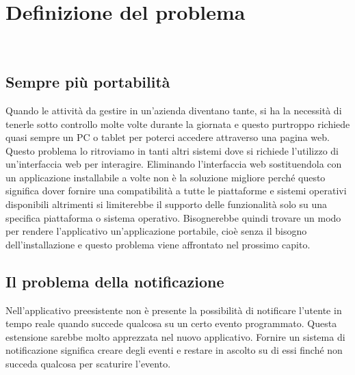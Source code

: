 
\chapter{Definizione del problema}
\label{cap:definizione-problema}

\\



\section{Sempre più portabilità}


Quando le attività da gestire in un'azienda diventano tante, si ha la necessità di tenerle sotto controllo molte volte durante la giornata e questo purtroppo richiede quasi sempre un PC o tablet per poterci accedere attraverso una pagina web. Questo problema lo ritroviamo in tanti altri sistemi dove si richiede l'utilizzo di un'interfaccia web per interagire. Eliminando l'interfaccia web sostituendola con un applicazione installabile a volte non è la soluzione migliore perché questo significa dover fornire una compatibilità a tutte le piattaforme e sistemi operativi disponibili altrimenti si  limiterebbe il supporto delle funzionalità solo su una specifica piattaforma o sistema operativo. Bisognerebbe quindi trovare un modo per rendere l'applicativo un'applicazione portabile, cioè senza il bisogno dell'installazione e questo problema viene affrontato nel prossimo capito.

\section{Il problema della notificazione}

Nell'applicativo preesistente non è presente  la possibilità di notificare l'utente in tempo reale quando succede qualcosa su un certo evento programmato.  Questa estensione sarebbe molto apprezzata nel nuovo applicativo. Fornire un sistema di notificazione significa creare degli eventi e restare in ascolto su di essi finché non succeda qualcosa per scaturire l'evento. \\

